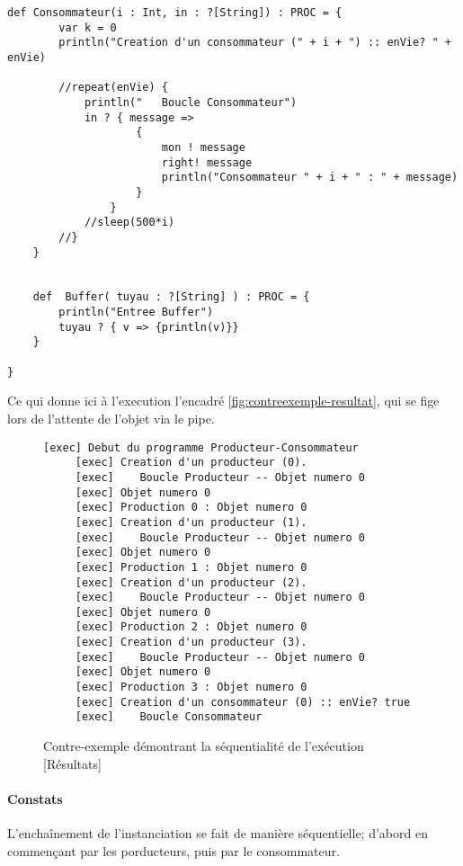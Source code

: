 \documentclass[a4paper,11pt,french]{report}
\begin{document}
\begin{lstlisting}[frame=trBL, title={Contre-exemple, suite : Consommateur et Buffer}, firstnumber=last]
    def Consommateur(i : Int, in : ?[String]) : PROC = {
        var k = 0
        println("Creation d'un consommateur (" + i + ") :: enVie? " + enVie)
        
        //repeat(enVie) {
            println("   Boucle Consommateur")
            in ? { message => 
                    {
                        mon ! message 
                        right! message 
                        println("Consommateur " + i + " : " + message)
                    } 
                }
            //sleep(500*i)
        //}
    }  
    

    def  Buffer( tuyau : ?[String] ) : PROC = {
        println("Entree Buffer")
        tuyau ? { v => {println(v)}}
    }
    
}
\end{lstlisting}

Ce qui donne ici à l'execution l'encadré \vref{fig:contreexemple-resultat}, qui se fige lors de l'attente de l'objet via le pipe.

\begin{figure}[h]
\begin{lstlisting}[frame=trBL]
     [exec] Debut du programme Producteur-Consommateur
     [exec] Creation d'un producteur (0).
     [exec]    Boucle Producteur -- Objet numero 0
     [exec] Objet numero 0
     [exec] Production 0 : Objet numero 0
     [exec] Creation d'un producteur (1).
     [exec]    Boucle Producteur -- Objet numero 0
     [exec] Objet numero 0
     [exec] Production 1 : Objet numero 0
     [exec] Creation d'un producteur (2).
     [exec]    Boucle Producteur -- Objet numero 0
     [exec] Objet numero 0
     [exec] Production 2 : Objet numero 0
     [exec] Creation d'un producteur (3).
     [exec]    Boucle Producteur -- Objet numero 0
     [exec] Objet numero 0
     [exec] Production 3 : Objet numero 0
     [exec] Creation d'un consommateur (0) :: enVie? true
     [exec]    Boucle Consommateur
\end{lstlisting}
\caption{Contre-exemple démontrant la séquentialité de l'exécution [Résultats]}
\label{fig:contreexemple-resultat}
\end{figure}

\paragraph{Constats} L'encha\^inement de l'instanciation se fait de manière séquentielle; d'abord en commençant par les porducteurs, puis par le consommateur.
\end{document}
